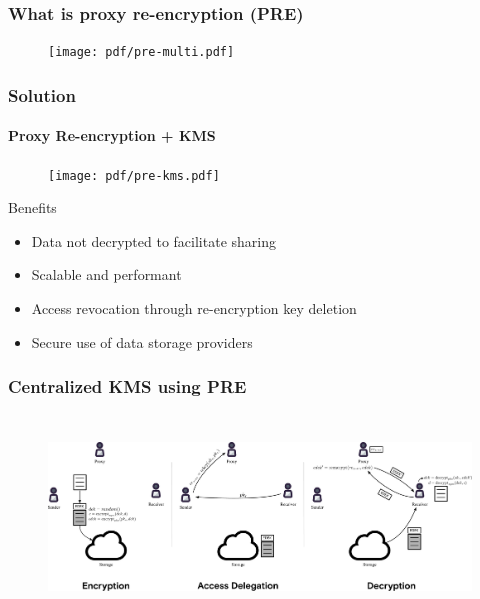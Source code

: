 \documentclass[xetex,mathsans,sans,aspectratio=169]{beamer}
\begin{document}
    \begin{frame}
        \frametitle{What is proxy re-encryption (PRE)}
        \begin{figure}
            \centering
            \texttt{[image: pdf/pre-multi.pdf]}
        \end{figure}
    \end{frame}

    \begin{frame}
        \frametitle{Solution}
        \framesubtitle{Proxy Re-encryption + KMS}
        \begin{figure}
            \centering
            \texttt{[image: pdf/pre-kms.pdf]}
        \end{figure}

        Benefits
        \begin{itemize}
            \item Data not decrypted to facilitate sharing
            \item Scalable and performant
            \item Access revocation through re-encryption key deletion
            \item Secure use of data storage providers
        \end{itemize}
    \end{frame}

    \begin{frame}
        \frametitle{Centralized KMS using PRE}
        \begin{figure}
            \centering
            \includegraphics[height=5.4cm]{pdf/centralized-consolidated.pdf}
        \end{figure}
    \end{frame}
\end{document}
